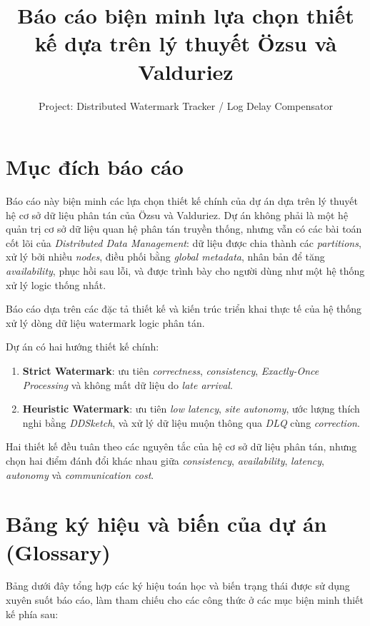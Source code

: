 \documentclass[12pt,a4paper]{article}
\title{Báo cáo biện minh lựa chọn thiết kế dựa trên lý thuyết Özsu và Valduriez}
\author{Project: Distributed Watermark Tracker / Log Delay Compensator}
\date{}
\begin{document}

\maketitle

\section{Mục đích báo cáo}

Báo cáo này biện minh các lựa chọn thiết kế chính của dự án dựa trên lý thuyết hệ cơ sở dữ liệu phân tán của Özsu và Valduriez. Dự án không phải là một hệ quản trị cơ sở dữ liệu quan hệ phân tán truyền thống, nhưng vẫn có các bài toán cốt lõi của \textit{Distributed Data Management}: dữ liệu được chia thành các \textit{partitions}, xử lý bởi nhiều \textit{nodes}, điều phối bằng \textit{global metadata}, nhân bản để tăng \textit{availability}, phục hồi sau lỗi, và được trình bày cho người dùng như một hệ thống xử lý logic thống nhất.

Báo cáo dựa trên các đặc tả thiết kế và kiến trúc triển khai thực tế của hệ thống xử lý dòng dữ liệu watermark logic phân tán.

Dự án có hai hướng thiết kế chính:

\begin{enumerate}
    \item \textbf{Strict Watermark}: ưu tiên \textit{correctness}, \textit{consistency}, \textit{Exactly-Once Processing} và không mất dữ liệu do \textit{late arrival}.
    \item \textbf{Heuristic Watermark}: ưu tiên \textit{low latency}, \textit{site autonomy}, ước lượng thích nghi bằng \textit{DDSketch}, và xử lý dữ liệu muộn thông qua \textit{DLQ} cùng \textit{correction}.
\end{enumerate}

Hai thiết kế đều tuân theo các nguyên tắc của hệ cơ sở dữ liệu phân tán, nhưng chọn hai điểm đánh đổi khác nhau giữa \textit{consistency}, \textit{availability}, \textit{latency}, \textit{autonomy} và \textit{communication cost}.

\section{Bảng ký hiệu và biến của dự án (Glossary)}

Bảng dưới đây tổng hợp các ký hiệu toán học và biến trạng thái được sử dụng xuyên suốt báo cáo, làm tham chiếu cho các công thức ở các mục biện minh thiết kế phía sau:
\end{document}
